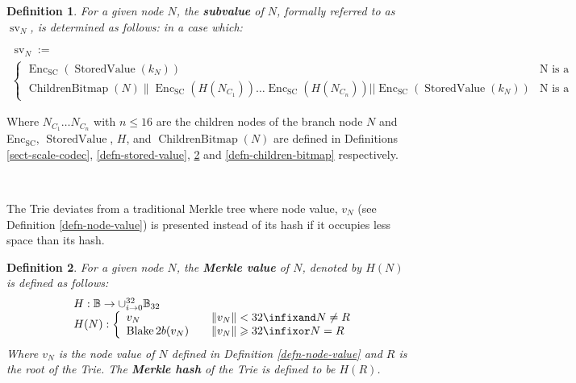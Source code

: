 \documentclass{book}
\newcommand{\assign}{:=}
\newcommand{\nobracket}{}
\newcommand{\tmop}[1]{\ensuremath{\operatorname{#1}}}
\newcommand{\tmrsub}[1]{\ensuremath{_{\textrm{#1}}}}
\newcommand{\tmstrong}[1]{\textbf{#1}}
\newcommand{\tmtextbf}[1]{{\bfseries{#1}}}
\newcommand{\tmtexttt}[1]{{\ttfamily{#1}}}
\newcommand{\tmverbatim}[1]{{\ttfamily{#1}}}
\newtheorem{definition}{Definition}
\providecommand{\nobracket}{}
\providecommand{\tmop}[1]{\ensuremath{\mathrm{#1}}}
\providecommand{\tmrsub}[1]{\tmrsub{\ensuremath{\mathrm{#1}}}}
\providecommand{\tmstrong}[1]{\tmtextbf{#1}}
\providecommand{\tmtextbf}[1]{\tmtextbf{#1}}
\providecommand{\tmverbatim}[1]{\tmtexttt{#1}}
\newtheorem{definition}{Definition}
\begin{document}
\tmverbatim{}

\begin{definition}
  \label{defn-node-subvalue}For a given node $N$, the {\tmstrong{subvalue}} of
  $N$, formally referred to as $\tmop{sv}_N$, is determined as follows: in a
  case which:
  \begin{itemize}
    \[ \begin{array}{l}
         \tmop{sv}_N \assign\\
         \left\{ \begin{array}{cc}
           \tmop{Enc}_{\tmop{SC}} (\tmop{StoredValue} (k_N)) & \text{N is a
           leaf node}\\
           \nobracket \tmop{ChildrenBitmap} (N)\| \tmop{Enc}_{\tmop{SC}} (H
           (N_{C_1})) \ldots \tmop{Enc}_{\tmop{SC}} (H (N_{C_n})) | |
           \tmop{Enc}_{\tmop{SC}} (\tmop{StoredValue} (k_N))  & \text{N is a
           branch node}
         \end{array} \right.
       \end{array} \]
  \end{itemize}
\end{definition}

Where $N_{C_1} \ldots N_{C_n}$ with $n \leqslant 16$ are the children nodes of
the branch node $N$ and Enc\tmrsub{SC}, $\tmop{StoredValue}$, $H$, and
$\tmop{ChildrenBitmap} (N)$ are defined in Definitions \ref{sect-scale-codec},
\ref{defn-stored-value}, \ref{defn-merkle-value} and
\ref{defn-children-bitmap} respectively.

\

The Trie deviates from a traditional Merkle tree where node value, $v_N$ (see
Definition \ref{defn-node-value}) is presented instead of its hash if it
occupies less space than its hash.

\begin{definition}
  \label{defn-merkle-value}For a given node $N$, the {\tmstrong{Merkle value}}
  of $N$, denoted by $H (N)$ is defined as follows:
  \[ \begin{array}{ll}
       & H : \mathbb{B} \rightarrow \cup_{i \rightarrow 0}^{32}
       \mathbb{B}_{32}\\
       & H (N) : \left\{ \begin{array}{lcl}
         v_N &  & \|v_N \|< 32 \infixand N \neq R\\
         \tmop{Blake} 2 b (v_N) &  & \|v_N \| \geqslant 32 \infixor N = R
       \end{array} \right.
     \end{array} \]
  Where $v_N$ is the node value of $N$ defined in Definition
  \ref{defn-node-value} and $R$ is the root of the Trie. The {\tmstrong{Merkle
  hash}} of the Trie is defined to be $H (R)$.
\end{definition}
\end{document}
